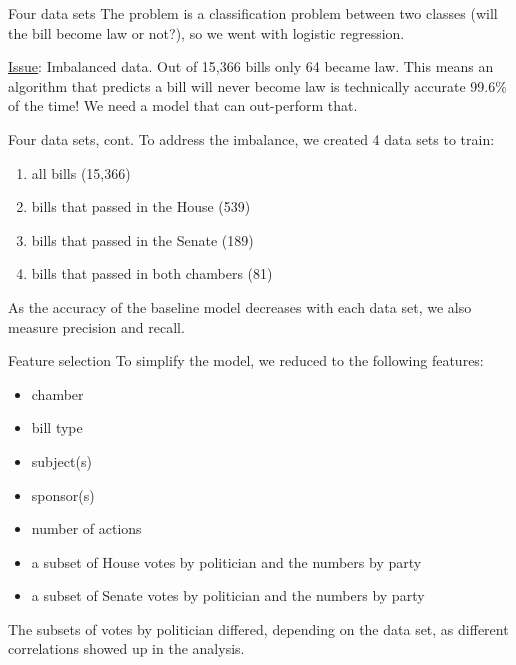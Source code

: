 \documentclass[handout,
	12pt]{beamer}
\begin{document}
\begin{frame}{Four data sets}{}
The problem is a classification problem between two classes (will the bill become law or not?), so we went with logistic regression.  

\pause
\vspace{1pc}
\underline{Issue}:  Imbalanced data.  Out of 15,366 bills only 64 became law.  This means an algorithm that predicts a bill will never become law is technically accurate 99.6\% of the time!  We need a model that can out-perform that.
\end{frame}

\begin{frame}{Four data sets, cont.}{}
To address the imbalance, we created 4 data sets to train:

\pause
\begin{multicols}{2}
\begin{enumerate}
\itemsep0em
\item all bills (15,366)
\pause
\item bills that passed in the House (539)
\pause
\item bills that passed in the Senate (189)
\pause
\item bills that passed in both chambers (81)
\end{enumerate}
\end{multicols}
\pause
As the accuracy of the baseline model decreases with each data set, we also measure precision and recall.
\end{frame}

\begin{frame}{Feature selection}{}
To simplify the model, we reduced to the following features:
\pause
\begin{itemize}
\itemsep0em
\item chamber
\item bill type
\item subject(s)
\item sponsor(s)
\item number of actions
\item a subset of House votes by politician and the numbers by party
\item a subset of Senate votes by politician and the numbers by party
\end{itemize}
\pause
The subsets of votes by politician differed, depending on the data set, as different correlations showed up in the analysis.
\end{frame}
\end{document}
